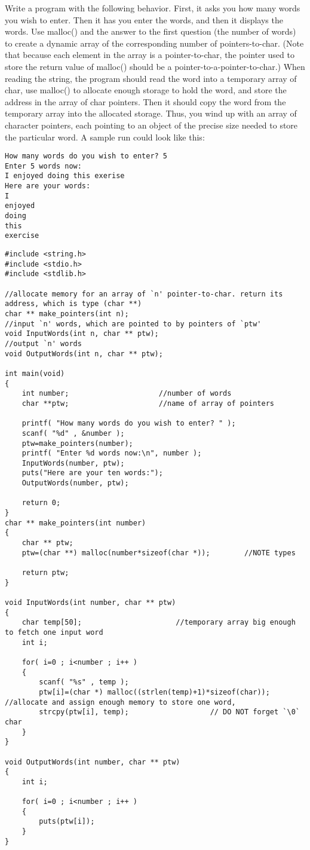 \begin{question}
Write a program with the following behavior. First, it asks you how many words you
wish to enter. Then it has you enter the words, and then it displays the words. Use
malloc() and the answer to the first question (the number of words) to create a dynamic
array of the corresponding number of pointers-to-char. (Note that because each element
in the array is a pointer-to-char, the pointer used to store the return value of malloc()
should be a pointer-to-a-pointer-to-char.) When reading the string, the program should
read the word into a temporary array of char, use malloc() to allocate enough storage
to hold the word, and store the address in the array of char pointers. Then it should
copy the word from the temporary array into the allocated storage. Thus, you wind up
with an array of character pointers, each pointing to an object of the precise size needed
to store the particular word. A sample run could look like this:
\begin{verbatim}
How many words do you wish to enter? 5
Enter 5 words now:
I enjoyed doing this exerise
Here are your words:
I
enjoyed
doing
this
exercise
\end{verbatim}
\end{question}
\begin{solution}
  \begin{verbatim}
#include <string.h>
#include <stdio.h>
#include <stdlib.h>

//allocate memory for an array of `n' pointer-to-char. return its address, which is type (char **)
char ** make_pointers(int n);
//input `n' words, which are pointed to by pointers of `ptw'
void InputWords(int n, char ** ptw);
//output `n' words
void OutputWords(int n, char ** ptw);

int main(void)
{
	int number;						//number of words
	char **ptw;						//name of array of pointers

	printf( "How many words do you wish to enter? " );
	scanf( "%d" , &number );
	ptw=make_pointers(number);
	printf( "Enter %d words now:\n", number );
	InputWords(number, ptw);
	puts("Here are your ten words:");
	OutputWords(number, ptw);

	return 0;
}
char ** make_pointers(int number)
{
	char ** ptw;
	ptw=(char **) malloc(number*sizeof(char *));		//NOTE types

	return ptw;
}

void InputWords(int number, char ** ptw)
{
	char temp[50];						//temporary array big enough to fetch one input word
	int i;

	for( i=0 ; i<number ; i++ )
	{
		scanf( "%s" , temp );
		ptw[i]=(char *) malloc((strlen(temp)+1)*sizeof(char));	//allocate and assign enough memory to store one word,
		strcpy(ptw[i], temp);					// DO NOT forget `\0` char
	}
}

void OutputWords(int number, char ** ptw)
{
	int i;

	for( i=0 ; i<number ; i++ )
	{
		puts(ptw[i]);
	}
}
  \end{verbatim}
\end{solution}

